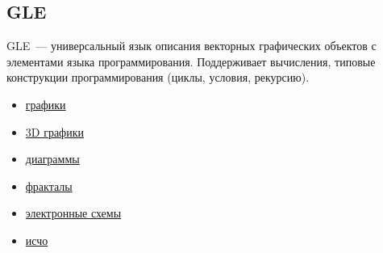 \subsection{GLE}

GLE\ --- универсальный язык описания векторных графических объектов с
элементами языка программирования. Поддерживает вычисления, типовые конструкции
программирования (циклы, условия, рекурсию).

\begin{itemize}
  \item\href{http://glx.sourceforge.net/examples/2dplots/index.html}{графики}
  \item\href{http://glx.sourceforge.net/examples/3dplots/index.html}{3D графики}
  \item\href{http://glx.sourceforge.net/examples/diagrams/index.html}{диаграммы}
  \item\href{http://glx.sourceforge.net/examples/fractals/index.html}{фракталы}
  \item\href{http://glx.sourceforge.net/examples/electronic/index.html}{электронные
  схемы}
  \item\href{http://glx.sourceforge.net/examples/other/index.html}{исчо}
\end{itemize}
